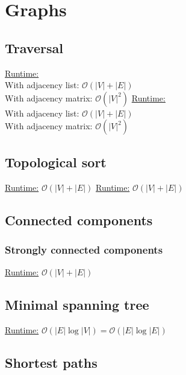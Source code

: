 \section{Graphs}
\subsection{Traversal}

\underline{Runtime:}\\
With adjacency list: $\mathcal{O}(\lvert V \rvert + \lvert E \rvert)$ \\
With adjacency matrix: $\mathcal{O}(\lvert V \rvert^2)$
\underline{Runtime:}\\
With adjacency list: $\mathcal{O}(\lvert V \rvert + \lvert E \rvert)$ \\
With adjacency matrix: $\mathcal{O}(\lvert V \rvert^2)$

\subsection{Topological sort}

\underline{Runtime:} $\mathcal{O}(\lvert V \rvert + \lvert E \rvert)$
\underline{Runtime:} $\mathcal{O}(\lvert V \rvert + \lvert E \rvert)$

\subsection{Connected components}

\subsubsection{Strongly connected components}
\underline{Runtime:} $\mathcal{O}(\lvert V \rvert + \lvert E \rvert)$


\subsection{Minimal spanning tree}
\underline{Runtime:} $\mathcal{O}(\lvert E \rvert \log \lvert V
\rvert) = \mathcal{O}(\lvert E \rvert \log \lvert E \rvert)$

\subsection{Shortest paths}

